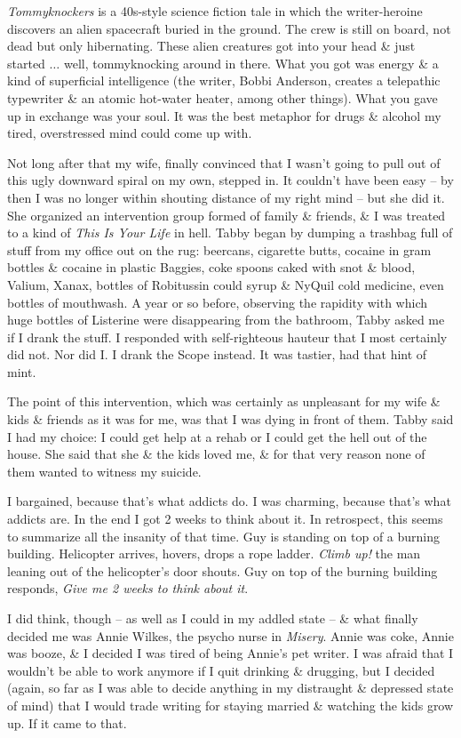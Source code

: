 \documentclass{article}
\numberwithin{equation}{section}
\begin{document}
\textit{Tommyknockers} is a 40s-style science fiction tale in which the writer-heroine discovers an alien spacecraft buried in the ground. The crew is still on board, not dead but only hibernating. These alien creatures got into your head \& just started $\ldots$ well, tommyknocking around in there. What you got was energy \& a kind of superficial intelligence (the writer, Bobbi Anderson, creates a telepathic typewriter \& an atomic hot-water heater, among other things). What you gave up in exchange was your soul. It was the best metaphor for drugs \& alcohol my tired, overstressed mind could come up with.

Not long after that my wife, finally convinced that I wasn't going to pull out of this ugly downward spiral on my own, stepped in. It couldn't have been easy -- by then I was no longer within shouting distance of my right mind -- but she did it. She organized an intervention group formed of family \& friends, \& I was treated to a kind of \textit{This Is Your Life} in hell. Tabby began by dumping a trashbag full of stuff from my office out on the rug: beercans, cigarette butts, cocaine in gram bottles \& cocaine in plastic Baggies, coke spoons caked with snot \& blood, Valium, Xanax, bottles of Robitussin could syrup \& NyQuil cold medicine, even bottles of mouthwash. A year or so before, observing the rapidity with which huge bottles of Listerine were disappearing from the bathroom, Tabby asked me if I drank the stuff. I responded with self-righteous hauteur that I most certainly did not. Nor did I. I drank the Scope instead. It was tastier, had that hint of mint.

The point of this intervention, which was certainly as unpleasant for my wife \& kids \& friends as it was for me, was that I was dying in front of them. Tabby said I had my choice: I could get help at a rehab or I could get the hell out of the house. She said that she \& the kids loved me, \& for that very reason none of them wanted to witness my suicide.

I bargained, because that's what addicts do. I was charming, because that's what addicts are. In the end I got 2 weeks to think about it. In retrospect, this seems to summarize all the insanity of that time. Guy is standing on top of a burning building. Helicopter arrives, hovers, drops a rope ladder. \textit{Climb up!} the man leaning out of the helicopter's door shouts. Guy on top of the burning building responds, \textit{Give me 2 weeks to think about it}.

I did think, though -- as well as I could in my addled state -- \& what finally decided me was Annie Wilkes, the psycho nurse in \textit{Misery}. Annie was coke, Annie was booze, \& I decided I was tired of being Annie's pet writer. I was afraid that I wouldn't be able to work anymore if I quit drinking \& drugging, but I decided (again, so far as I was able to decide anything in my distraught \& depressed state of mind) that I would trade writing for staying married \& watching the kids grow up. If it came to that.
\end{document}
